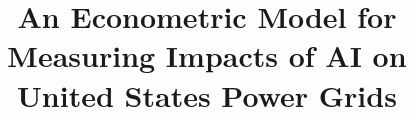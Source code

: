 \documentclass[sigconf,authordraft]{acmart}
\begin{document}
\title{An Econometric Model for Measuring Impacts of AI on United States Power Grids}






\end{document}

